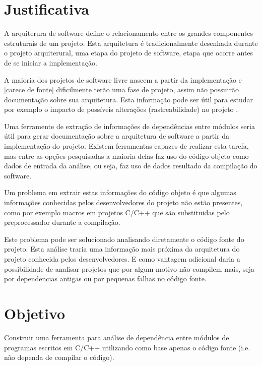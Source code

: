 \chapter{Justificativa}

A arquiterura de software define o relacionamento entre os grandes componentes
estruturais de um projeto\cite{EngenhariaDeSoftwarePressman}. Esta arquitetura
é tradicionalmente desenhada durante o projeto arquiterural, uma etapa do projeto
de software, etapa que ocorre antes de se iniciar a implementação.

A maioria dos projetos de software livre nascem a partir da implementação e
[carece de fonte] dificilmente terão uma fase de projeto, assim não possuirão
documentação sobre sua arquitetura. Esta informação pode ser útil para estudar
por exemplo o impacto de possíveis alterações (rastreabilidade) no projeto
\cite{mata26-terceiro-projeto-piloto}.

Uma ferramente de extração de informações de dependências entre módulos seria útil
para gerar documentação sobre a arquitetura de software a partir da implementação
do projeto. Existem ferramentas capazes de realizar esta tarefa, mas entre as opções
pesquisadas\cite{SourceVersusObjectCodeExtraction} a maioria delas faz uso do
código objeto como dados de entrada da análise, ou seja, faz uso de dados resultado
da compilação do software.

Um problema em extrair estas informações do código objeto é que algumas
informações conhecidas pelos desenvolvedores do projeto não estão presentes,
como por exemplo macros em projetos C/C++ que são substituidas pelo
preprocessador\cite{SourceVersusObjectCodeExtraction} durante a compilação.

Este problema pode ser solucionado analisando diretamente o código fonte do
projeto. Esta análise traria uma informação mais próxima da arquitetura do
projeto conhecida pelos desenvolvedores. E como vantagem adicional daria a
possibilidade de analisar projetos que por algum motivo não compilem mais, seja
por dependencias antigas ou por pequenas falhas no código fonte.

\chapter{Objetivo}

Construir uma ferramenta para análise de dependência entre módulos de programas
escritos em C/C++ utilizando como base apenas o código fonte (i.e.  não dependa
de compilar o código).


